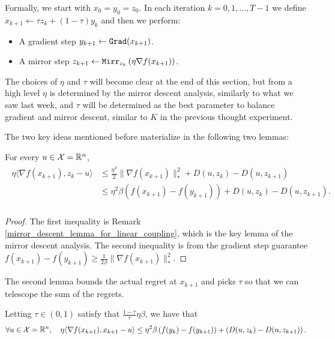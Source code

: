 Formally, we start with $x_0 = y_0 = z_0$. In each iteration $k= 0, 1, \dots, T-1$ we define $x_{k+1} \gets \tau z_k + (1-\tau) y_k$ and then we perform:
\begin{itemize}
    \item A gradient step $y_{k+1} \gets {\tt{Grad}}(x_{k+1})$.
    \item A mirror step $z_{k+1} \gets {\tt{Mirr}}_{z_k}\left(\eta \nabla f(x_{k+1})\right)$.
\end{itemize}
The choices of $\eta$ and $\tau$ will become clear at the end of this section, but from a high level $\eta$ is determined by the mirror descent analysis, similarly to what we saw last week, and $\tau$ will be determined as the best parameter to balance gradient and mirror descent, similar to $K$ in the previous thought experiment.

The two key ideas mentioned before materialize in the following two lemmas:
\begin{lemma}\label{lemma:mirror_bound}
    For every $u \in \mathcal{X} = \mathbb{R}^n$,
    \begin{align}\label{mirror_bound_in_linear_coupling}
        \begin{aligned}
            \eta \langle \nabla f(x_{k+1}), z_k -u \rangle & \leq \frac{\eta^2}{2} \| \nabla f(x_{k+1})\|^2_\ast + D(u, {z_k}) - D(u, {z_{k+1}}) \\
                                                           & \leq \eta^2 \beta (f(x_{k+1}) - f(y_{k+1})) + D(u, {z_k}) - D(u, {z_{k+1}}). \\
        \end{aligned}
    \end{align}
\end{lemma}

\begin{proof}
    The first inequality is Remark \ref{mirror_descent_lemma_for_linear_coupling}, which is the key lemma of the mirror descent analysis. The second inequality is from the gradient step guarantee $f(x_{k+1}) - f(y_{k+1}) \geq \frac{1}{2\beta}\| \nabla f(x_{k+1})\|^2_\ast$.
\end{proof}

The second lemma bounds the actual regret at $x_{k+1}$ and picks $\tau$ so that we can telescope the sum of the regrets.

\begin{lemma}[Coupling]\label{lemma_simplified_coupling} Letting $\tau \in (0, 1)$ satisfy that $\frac{1-\tau}{\tau}  \eta\beta$, we have that
\[
    \forall u \in \mathcal{X} = \mathbb{R}^n, \quad \eta \langle \nabla f(x_{k+1}), x_{k+1} - u \rangle \leq \eta^2\beta\left( f(y_k) - f(y_{k+1})\right) + \left( D(u, {z_k}) - D(u, {z_{k+1}})\right).
\]
\end{lemma}

